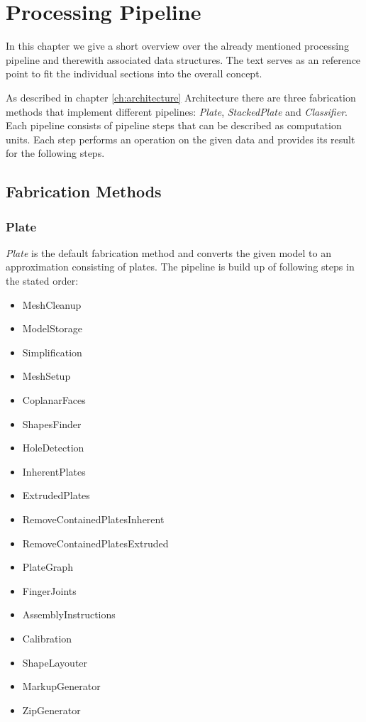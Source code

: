 \documentclass[../ClassicThesis.tex]{subfiles}
\begin{document}
\chapter{Processing Pipeline}\label{ch:processingPipeline}

In this chapter we give a short overview over the already mentioned processing pipeline and therewith associated data structures. The text serves as an reference point to fit the individual sections into the overall concept.

As described in chapter \ref{ch:architecture} Architecture there are three fabrication methods that implement different pipelines: \emph{Plate}, \emph{StackedPlate} and \emph{Classifier}. Each pipeline consists of pipeline steps that can be described as computation units. Each step performs an operation on the given data and provides its result for the following steps.


\section{Fabrication Methods}

\subsection{Plate}

\emph{Plate} is the default fabrication method and converts the given model to an approximation consisting of plates. The pipeline is build up of following steps in the stated order: 

\begin{itemize}
    \item MeshCleanup
    \item ModelStorage
    \item Simplification
    \item MeshSetup
    \item CoplanarFaces
    \item ShapesFinder
    \item HoleDetection
    \item InherentPlates
    \item ExtrudedPlates
    \item RemoveContainedPlatesInherent
    \item RemoveContainedPlatesExtruded
    \item PlateGraph
    \item FingerJoints
    \item AssemblyInstructions
    \item Calibration
    \item ShapeLayouter
    \item MarkupGenerator
    \item ZipGenerator
\end{itemize}
\end{document}
